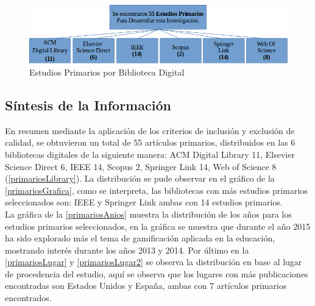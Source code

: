 \documentclass{report}
\begin{document}
            \begin{figure}
        		\begin{center}
        			\includegraphics[scale=0.45]{images/1document/seleccionParte2.png}
        			\caption{Estudios Primarios por Biblioteca Digital}
		        	\label{primarios}
           		\end{center}
        	\end{figure}
	
    	    \subsection{Síntesis de la Información}
    	     
    	    En resumen mediante la aplicación de los criterios de inclusión y exclusión de calidad, se obtuvieron un total de 55 artículos primarios, distribuidos en las 6 bibliotecas digitales de la siguiente manera: ACM Digital Library 11, Elsevier Science Direct 6, IEEE 14, Scopus 2, Springer Link 14, Web of Science 8 (\autoref{primariosLibrary}). La distribución se pude observar en el gráfico de la \autoref{primariosGrafica}, como se interpreta, las bibliotecas con más estudios primarios seleccionados son: IEEE y Springer Link ambas con 14 estudios primarios.\\
    	    La gráfica de la \autoref{primariosAnios} muestra la distribución de los años para los estudios primarios seleccionados, en la gráfica se muestra que durante el año 2015 ha sido explorado más el tema de gamificación aplicada en la educación, mostrando interés durante los años 2013 y 2014.
    	    Por último en la \autoref{primariosLugar} y \autoref{primariosLugar2} se observa la distribución en base al lugar de procedencia del estudio, aquí se observa que los lugares con más publicaciones encontradas son Estados Unidos y España, ambas con 7 artículos primarios encontrados.
    	    
\end{document}
